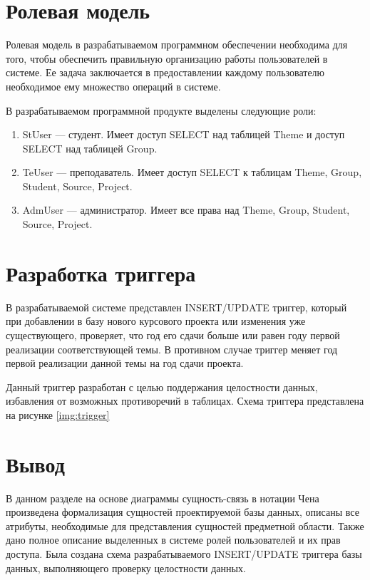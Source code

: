 \section{Ролевая модель}

Ролевая модель в разрабатываемом программном обеспечении необходима для того, чтобы обеспечить правильную организацию работы пользователей в системе. Ее задача заключается в предоставлении каждому пользователю необходимое ему множество операций в системе.

В разрабатываемом программной продукте выделены следующие роли:
\begin{enumerate}
\item StUser --- студент. Имеет доступ SELECT над таблицей Theme и доступ SELECT над таблицей Group.

\item TeUser --- преподаватель. Имеет доступ SELECT к таблицам Theme, Group, Student, Source, Project.



\item AdmUser --- администратор. Имеет все права над Theme, Group, Student, Source, Project.
\end{enumerate}

\section{Разработка триггера}

В разрабатываемой системе представлен INSERT/UPDATE триггер, который при добавлении в базу нового курсового проекта или изменения уже существующего, проверяет, что год его сдачи больше или равен году первой реализации соответствующей темы. В противном случае триггер меняет год первой реализации данной темы на год сдачи проекта. 

Данный триггер разработан с целью поддержания целостности данных, избавления от возможных противоречий в таблицах.
\clearpage
Схема триггера представлена на рисунке \ref{img:trigger}
\newline



\section{Вывод}
В данном разделе на основе диаграммы сущность-связь в нотации Чена произведена формализация сущностей проектируемой базы данных, описаны все атрибуты, необходимые для представления сущностей предметной области. Также дано полное описание выделенных в системе ролей пользователей и их прав доступа. Была создана схема разрабатываемого INSERT/UPDATE триггера базы данных, выполняющего проверку целостности данных.

